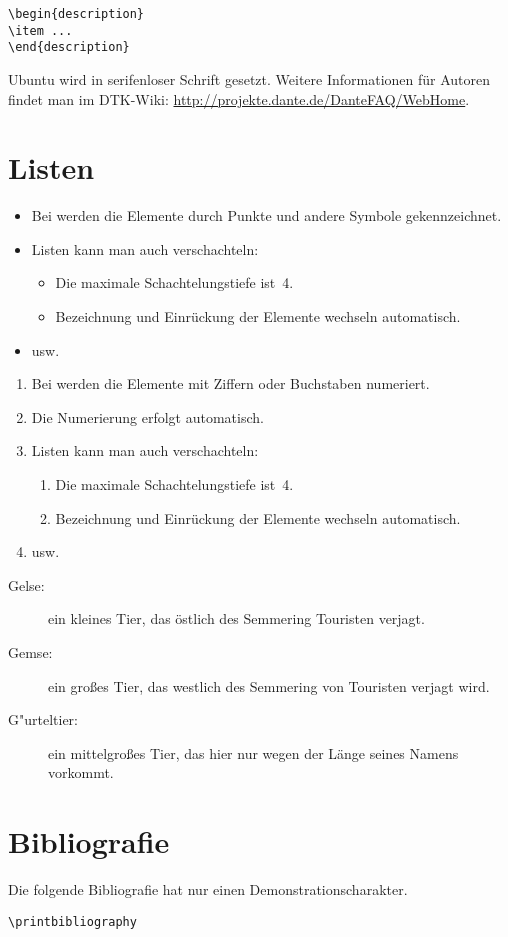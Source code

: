 \documentclass[ngerman]{dtk}
\begin{document}
\begin{lstlisting}[style=noNumber]
\begin{description}
\item ...
\end{description}
\end{lstlisting}

\textsf{Ubuntu} wird in serifenloser Schrift gesetzt.
Weitere Informationen für Autoren findet man im DTK-Wiki:
\url{http://projekte.dante.de/DanteFAQ/WebHome}.


\section{Listen}
\begin{itemize}
\item Bei  werden
die Elemente durch Punkte und andere Symbole gekennzeichnet. 
\item Listen kann man auch verschachteln:
  \begin{itemize}
  \item Die maximale Schachtelungstiefe ist~4.~\cite{voss:2012}
  \item
  Bezeichnung und Ein\-rückung der Elemente
  wechseln automatisch.
  \end{itemize}
\item usw.
\end{itemize}

\begin{enumerate}
\item Bei  werden
die Elemente mit Ziffern oder Buchstaben numeriert.
\item Die Numerierung erfolgt automatisch.~\cite{pakin:2008}
\item Listen kann man auch
verschachteln:
  \begin{enumerate}
  \item Die maximale Schachtelungstiefe
  ist~4.
  \item Bezeichnung und Ein\-rückung der Elemente
  wechseln automatisch.
  \end{enumerate}
\item usw.
\end{enumerate}

\begin{description}
\item[Gelse:]
   ein kleines Tier, das
   östlich des Semmering Touristen verjagt.
\item[Gemse:]
   ein großes Tier, das
   westlich des Semmering von Touristen verjagt wird.
\item[G"urteltier:]
   ein mittelgroßes Tier, das
   hier nur wegen der Länge seines Namens vorkommt.
\end{description}

\section{Bibliografie}
Die folgende Bibliografie hat nur einen 
Demonstrationscharakter.

\begin{lstlisting}[style=number]
\printbibliography
\end{lstlisting}

\nocite{*}
\printbibliography
\end{document}
